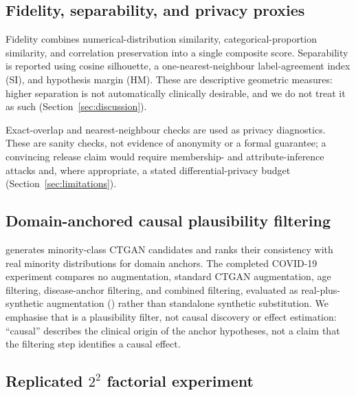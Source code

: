 \subsection{Fidelity, separability, and privacy proxies}
\label{sec:proxies}

Fidelity combines numerical-distribution similarity, categorical-proportion similarity, and correlation preservation into a single composite score. Separability is reported using cosine silhouette, a one-nearest-neighbour label-agreement index (SI), and hypothesis margin (HM). These are descriptive geometric measures: higher separation is not automatically clinically desirable, and we do not treat it as such (Section~\ref{sec:discussion}).

Exact-overlap and nearest-neighbour checks are used as privacy diagnostics. These are sanity checks, not evidence of anonymity or a formal guarantee; a convincing release claim would require membership- and attribute-inference attacks and, where appropriate, a stated differential-privacy budget (Section~\ref{sec:limitations}).

\subsection{Domain-anchored causal plausibility filtering}
\label{sec:dacpf}

\dacpf{} generates minority-class CTGAN candidates and ranks their consistency with real minority distributions for domain anchors. The completed COVID-19 experiment compares no augmentation, standard CTGAN augmentation, age filtering, disease-anchor filtering, and combined filtering, evaluated as real-plus-synthetic augmentation (\rsr{}) rather than standalone synthetic substitution. We emphasise that \dacpf{} is a plausibility filter, not causal discovery or effect estimation: ``causal'' describes the clinical origin of the anchor hypotheses, not a claim that the filtering step identifies a causal effect.

\subsection{Replicated $2^2$ factorial experiment}
\label{sec:factorial}

